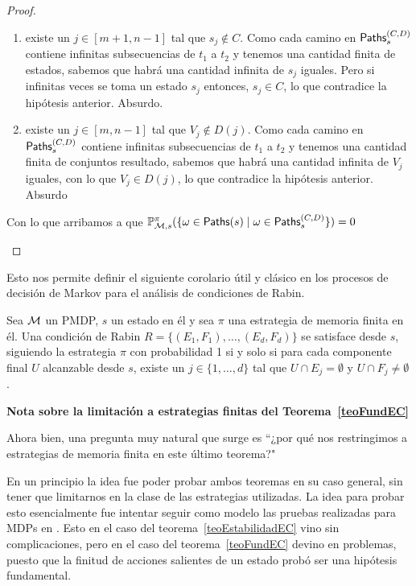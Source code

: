 \begin{proof}
\begin{itemize}
		      \begin{enumerate}
			      \item existe un $j \in [m+1, n-1]$ tal que $s_j \notin C$. Como cada camino en
			            $\textsf{Paths}_s^{(C,D)}$ contiene infinitas subsecuencias de $t_1$ a $t_2$ y tenemos
			            una cantidad finita de estados, sabemos que habrá una cantidad infinita de
			            $s_j$ iguales. Pero si infinitas veces se toma un estado $s_j$ entonces, $s_j
				            \in C$, lo que contradice la hipótesis anterior. Absurdo.

			      \item existe un $j \in [m, n-1]$ tal que $V_j \notin D(j)$. Como cada camino en
			            $\textsf{Paths}_s^{(C,D)}$ contiene infinitas subsecuencias de $t_1$ a $t_2$ y tenemos
			            una cantidad finita de conjuntos resultado, sabemos que habrá una cantidad
			            infinita de $V_j$ iguales, con lo que $V_j \in D(j)$, lo que contradice la
			            hipótesis anterior. Absurdo
		      \end{enumerate}
		      Con lo que arribamos a que $\mathbb{P}^\pi_{\mathcal{M}, s}(\{ \omega \in \textsf{Paths}(s) \mid \omega \in \textsf{Paths}_s^{(C,D)}\}) = 0  $
	\end{itemize}

\end{proof}

Esto nos permite definir el siguiente corolario útil y clásico en los procesos
de decisión de Markov para el análisis de condiciones de Rabin.

\begin{corollary}
	Sea $\mathcal{M}$ un PMDP, $s$ un estado en él y sea $\pi$ una estrategia de memoria finita en él. Una condición de Rabin $R = \{ (E_1, F_1), \dots, (E_d, F_d)\}$ se satisface desde $s$, siguiendo la estrategia $\pi$ con probabilidad 1 si y solo si para cada componente final $U$ alcanzable desde $s$, existe un $j \in \{ 1, \dots, d\}$ tal que $U \cap E_j = \emptyset$ y $U \cap F_j \neq \emptyset$.
\end{corollary}

\textbf{Nota sobre la limitación a estrategias finitas del Teorema~\ref{teoFundEC}}

Ahora bien, una pregunta muy natural que surge es ``¿por qué nos restringimos a
estrategias de memoria finita en este último teorema?"

En un principio la idea fue poder probar ambos teoremas en su caso general, sin
tener que limitarnos en la clase de las estrategias utilizadas. La idea para
probar esto esencialmente fue intentar seguir como modelo las pruebas
realizadas para MDPs en \cite{AlfaroThesis,BaierKatoen}. Esto en el caso del
teorema~\ref{teoEstabilidadEC} vino sin complicaciones, pero en el caso del
teorema~\ref{teoFundEC} devino en problemas, puesto que la finitud de acciones
salientes de un estado probó ser una hipótesis fundamental.

